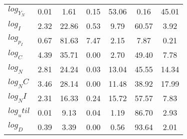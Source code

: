 \begin{center}
\begin{longtable}{lcccccc}
$log_Y_N   $	 & 	        0.01	 & 	        1.61	 & 	        0.15	 & 	       53.06	 & 	        0.16	 & 	       45.01 \\ 
$log_I     $	 & 	        2.32	 & 	       22.86	 & 	        0.53	 & 	        9.79	 & 	       60.57	 & 	        3.92 \\ 
$log_p_I   $	 & 	        0.67	 & 	       81.63	 & 	        7.47	 & 	        2.15	 & 	        7.87	 & 	        0.21 \\ 
$log_C     $	 & 	        4.39	 & 	       35.71	 & 	        0.00	 & 	        2.70	 & 	       49.40	 & 	        7.78 \\ 
$log_N     $	 & 	        2.81	 & 	       24.24	 & 	        0.03	 & 	       13.04	 & 	       45.55	 & 	       14.34 \\ 
$log_NC    $	 & 	        3.46	 & 	       28.14	 & 	        0.00	 & 	       11.48	 & 	       38.92	 & 	       17.99 \\ 
$log_NI    $	 & 	        2.31	 & 	       16.33	 & 	        0.24	 & 	       15.72	 & 	       57.57	 & 	        7.83 \\ 
$log_util  $	 & 	        0.01	 & 	        9.13	 & 	        0.04	 & 	        1.19	 & 	       86.70	 & 	        2.93 \\ 
$log_D     $	 & 	        0.39	 & 	        3.39	 & 	        0.00	 & 	        0.56	 & 	       93.64	 & 	        2.01 \\ 
\end{longtable}
 \end{center}
